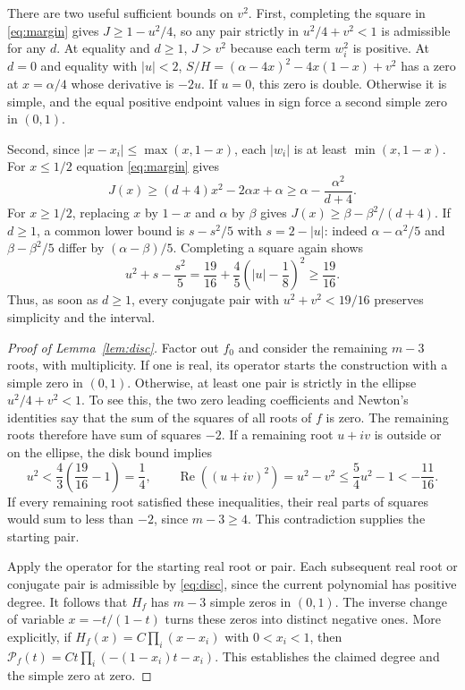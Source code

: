 \documentclass[11pt]{article}
\newcommand{\PP}{\mathcal P}
\newcommand{\Rea}{\operatorname{Re}}
\begin{document}
There are two useful sufficient bounds on $v^2$. First, completing
the square in \eqref{eq:margin} gives $J\ge1-u^2/4$, so any pair
strictly in $u^2/4+v^2<1$ is admissible for any $d$. At equality and
$d\ge1$, $J>v^2$ because each term $w_i^2$ is positive. At $d=0$
and equality with $|u|<2$, $S/H=(\alpha-4x)^2-4x(1-x)+v^2$ has a
zero at $x=\alpha/4$ whose derivative is $-2u$. If $u=0$, this
zero is double. Otherwise it is simple, and the equal positive endpoint
values in sign force a second simple zero in $(0,1)$.

Second, since $|x-x_i|\le\max(x,1-x)$, each $|w_i|$ is at least
$\min(x,1-x)$. For $x\le1/2$ equation \eqref{eq:margin} gives
\[
J(x)\ge (d+4)x^2-2\alpha x+\alpha
       \ge \alpha-\frac{\alpha^2}{d+4}.
\]
For $x\ge1/2$, replacing $x$ by $1-x$ and $\alpha$ by $\beta$ gives
$J(x)\ge\beta-\beta^2/(d+4)$. If $d\ge1$, a common lower bound is
$s-s^2/5$ with $s=2-|u|$: indeed
$\alpha-\alpha^2/5$ and $\beta-\beta^2/5$ differ by
$(\alpha-\beta)/5$. Completing a square again shows
\begin{equation}\label{eq:disc}
u^2+s-\frac{s^2}{5}
 =\frac{19}{16}+\frac45\left(|u|-\frac18\right)^2
 \ge\frac{19}{16}.
\end{equation}
Thus, as soon as $d\ge1$, every conjugate pair with
$u^2+v^2<19/16$ preserves simplicity and the interval.

\begin{proof}[Proof of Lemma~\ref{lem:disc}]
Factor out $f_0$ and consider the remaining $m-3$ roots, with
multiplicity. If one is real, its operator starts the construction with
a simple zero in $(0,1)$. Otherwise, at least one pair is strictly in
the ellipse $u^2/4+v^2<1$. To see this, the two zero leading
coefficients and Newton's identities say that the sum of the squares
of all roots of $f$ is zero. The remaining roots therefore have sum
of squares $-2$. If a remaining root $u+iv$ is outside or on the
ellipse, the disk bound implies
\[
u^2<\frac{4}{3}\left(\frac{19}{16}-1\right)=\frac14,
\qquad
\Rea((u+iv)^2)=u^2-v^2\le \frac54u^2-1<-\frac{11}{16}.
\]
If every remaining root satisfied these inequalities, their real
parts of squares would sum to less than $-2$, since $m-3\ge4$.
This contradiction supplies the starting pair.

Apply the operator for the starting real root or pair. Each subsequent
real root or conjugate pair is admissible by \eqref{eq:disc}, since the
current polynomial has positive degree. It follows that $H_f$ has
$m-3$ simple zeros in $(0,1)$. The inverse change of variable
$x=-t/(1-t)$ turns these zeros into distinct negative ones.
More explicitly, if $H_f(x)=C\prod_i(x-x_i)$ with $0<x_i<1$, then
$\PP_f(t)=Ct\prod_i(-(1-x_i)t-x_i)$. This establishes the claimed
degree and the simple zero at zero.
\end{proof}
\end{document}
